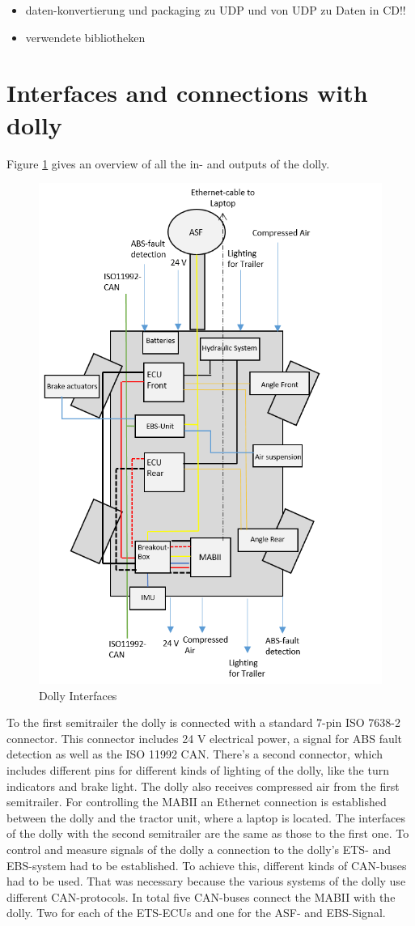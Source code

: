 \documentclass[ExampleMasters.tex]{subfiles}
\begin{document}
\begin{itemize}
	\item daten-konvertierung und packaging zu \gls{UDP} und von \gls{UDP} zu Daten in CD!!
	\item verwendete bibliotheken
\end{itemize}

\section{Interfaces and connections with dolly}
\label{sec:interface_with_dolly}
Figure \ref{fig:dolly_interfaces} gives an overview of all the in- and outputs of the dolly.\\

\begin{figure}[!htb]
	\centering
	\includegraphics[width=0.5\linewidth]{figures/ExampleCover}
	\caption{Dolly Interfaces}
	\label{fig:dolly_interfaces}
\end{figure}

To the first semitrailer the dolly is connected with a standard 7-pin ISO 7638-2 connector. This connector includes 24 V electrical power, a signal for \gls{ABS} fault detection as well as the ISO 11992 CAN.
There's a second connector, which includes different pins for different kinds of lighting of the dolly, like the turn indicators and brake light.
The dolly also receives compressed air from the first semitrailer.
For controlling the \gls{MABII} an Ethernet connection is established between the dolly and the tractor unit, where a laptop is located. 
The interfaces of the dolly with the second semitrailer are the same as those to the first one.  
To control and measure signals of the dolly a connection to the dolly's \gls{ETS}- and \gls{EBS}-system had to be established. To achieve this, different kinds of \gls{CAN}-buses had to be used. That was necessary because the various systems of the dolly use different CAN-protocols. In total five \gls{CAN}-buses connect the \gls{MABII} with the dolly. Two for each of the \gls{ETS}-\gls{ECU}s and one for the \gls{ASF}- and \gls{EBS}-Signal.
\end{document}
